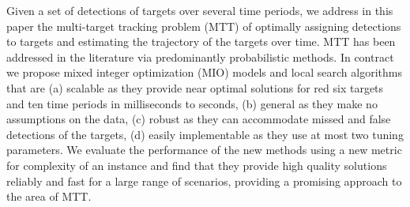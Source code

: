 Given a set of detections of targets over several time periods, we address in this paper the multi-target tracking problem (MTT) of optimally assigning detections to targets and estimating the trajectory of the targets over time. MTT has been addressed in the literature via predominantly probabilistic methods. In contract we propose mixed integer optimization (MIO) models and local search algorithms that are (a)  scalable as they provide near optimal solutions for red six targets and ten time periods in milliseconds to seconds, (b) general as they make no assumptions on the data, (c) robust as they can accommodate missed and false detections of the targets, (d) easily implementable as they use at most two tuning parameters. We evaluate the performance of the new methods using a new metric for complexity of an instance and find that they provide high quality solutions reliably and fast for a large range of scenarios, providing a promising approach to the area of MTT. 